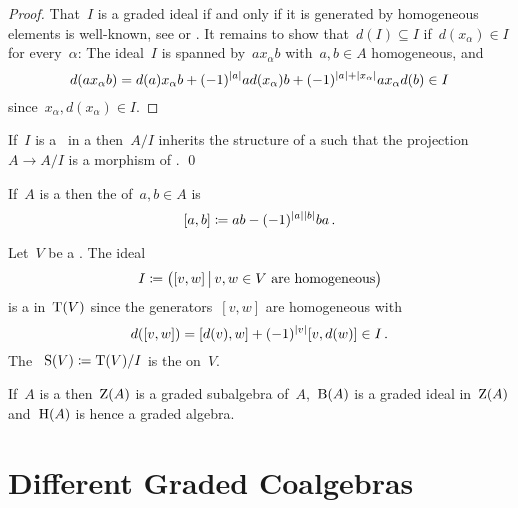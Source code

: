 \documentclass[a4paper,10pt,headings=standardclasses]{scrartcl}
\begin{document}
\begin{proof}
  That~$I$ is a graded ideal if and only if it is generated by homogeneous elements is  well-known, see \cite[IX, 2.5]{lang} or \cite[II.{\S}11.3]{bourbaki}.
  It remains to show that~$d(I) \subseteq I$ if~$d(x_\alpha) \in I$ for every~$\alpha$:
  The ideal~$I$ is spanned by~$a x_\alpha b$ with~$a, b \in A$ homogeneous, and
  \[
    d(a x_\alpha b)
    =
      d(a) x_\alpha b
    + (-1)^{\lvert a\rvert} a d(x_\alpha) b
    + (-1)^{\lvert a\rvert + \lvert x_\alpha\rvert} a x_\alpha d(b)
    \in
    I
  \]
  since~$x_\alpha, d(x_\alpha) \in I$.
\end{proof}

\begin{lemma}
  If~$I$ is a~{\dgi} in a {\dga} then~$A/I$ inherits the structure of a {\dga} such that the projection~$A \to A/I$ is a morphism of {\dgas}.
  \qed
\end{lemma}

\begin{definition}
  If~$A$ is a {\dga} then the  of~$a, b \in A$ is
  \[
    [a,b]
    \coloneqq
    ab - (-1)^{\lvert a\rvert\lvert b\rvert} ba \,.
  \]
\end{definition}

\begin{example}
  \label{dg symmetric algebra}
  Let~$V$ be a {\dgv}.
  The ideal
  \[
    I
    \defined
    \bigl(
      [v,w]
    \suchthat[\big]
      \text{$v,w \in V$ are homogeneous}
    \bigr)
  \]
  is a {\dgi} in~$\operatorname{T}(V)$ since the generators~$[v,w]$ are homogeneous with
  \[
    d([v,w])
    =
    [d(v), w] + (-1)^{\lvert v\rvert} [v, d(w)]
    \in
    I \,.
  \]
  The {\dga}~$\operatorname{S}(V) \coloneqq \operatorname{T}(V)/I$ is the  on~$V$.
\end{example}

\begin{proposition}
  If~$A$ is a {\dga} then~$\operatorname{Z}(A)$ is a graded subalgebra of~$A$,~$\operatorname{B}(A)$  is a graded ideal in~$\operatorname{Z}(A)$ and~$\operatorname{H}(A)$ is hence a graded algebra.
\end{proposition}




\section{Different Graded Coalgebras}
\end{document}
